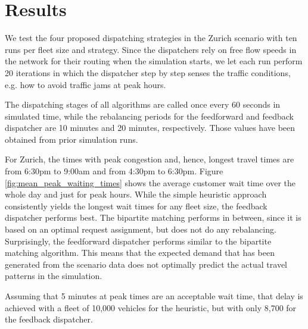 \section{Results}
\label{sec:results}

We test the four proposed dispatching strategies in the Zurich scenario with ten
runs per fleet size and strategy. Since the dispatchers rely on free flow speeds in the network
for their routing when the simulation starts, we let each run perform 20 iterations
in which the dispatcher step by step senses the traffic conditions, e.g. how to
avoid traffic jams at peak hours.

The dispatching stages of all algorithms are called once every 60 seconds in
simulated time, while the rebalancing periods for the feedforward and feedback
dispatcher are 10 minutes and 20 minutes, respectively. Those values have been
obtained from prior simulation runs.

For Zurich, the times with peak congestion and, hence, longest travel times
are from 6:30pm to 9:00am and from 4:30pm to 6:30pm. Figure \ref{fig:mean_peak_waiting_times}
shows the average customer wait time over the whole day and just for peak hours.
While the simple heuristic approach consistently yields the longest wait times
for any fleet size, the feedback dispatcher performs best. The bipartite matching
performs in between, since it is based on an optimal request assignment, but does
not do any rebalancing. Surprisingly, the feedforward dispatcher performs similar
to the bipartite matching algorithm. This means that the expected demand that
has been generated from the scenario data does not optimally predict the actual
travel patterns in the simulation.

Assuming that 5 minutes at peak times are an acceptable wait time, that delay is
achieved with a fleet of 10,000 vehicles for the heuristic, but with only 8,700
for the feedback dispatcher.

\captionsetup[subfigure]{width=0.9\textwidth}

